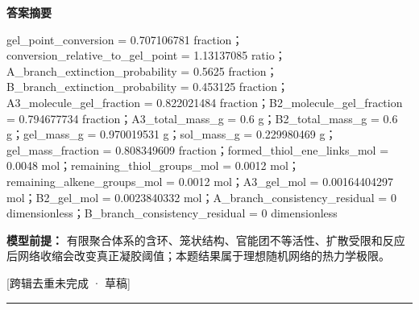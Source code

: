 \documentclass[UTF8,11pt,a4paper]{ctexart}
\begin{document}
\noindent\textbf{答案摘要}\par
gel\_point\_conversion = 0.707106781 fraction；conversion\_relative\_to\_gel\_point = 1.13137085 ratio；A\_branch\_extinction\_probability = 0.5625 fraction；B\_branch\_extinction\_probability = 0.453125 fraction；A3\_molecule\_gel\_fraction = 0.822021484 fraction；B2\_molecule\_gel\_fraction = 0.794677734 fraction；A3\_total\_mass\_g = 0.6 g；B2\_total\_mass\_g = 0.6 g；gel\_mass\_g = 0.970019531 g；sol\_mass\_g = 0.229980469 g；gel\_mass\_fraction = 0.808349609 fraction；formed\_thiol\_ene\_links\_mol = 0.0048 mol；remaining\_thiol\_groups\_mol = 0.0012 mol；remaining\_alkene\_groups\_mol = 0.0012 mol；A3\_gel\_mol = 0.00164404297 mol；B2\_gel\_mol = 0.0023840332 mol；A\_branch\_consistency\_residual = 0 dimensionless；B\_branch\_consistency\_residual = 0 dimensionless\par
\noindent\textbf{模型前提：}
有限聚合体系的含环、笼状结构、官能团不等活性、扩散受限和反应后网络收缩会改变真正凝胶阈值；本题结果属于理想随机网络的热力学极限。\par
\noindent\textcolor{red!65!black}{[跨辑去重未完成 · 草稿]} \par
\medskip\hrule\medskip
{}
\end{document}
